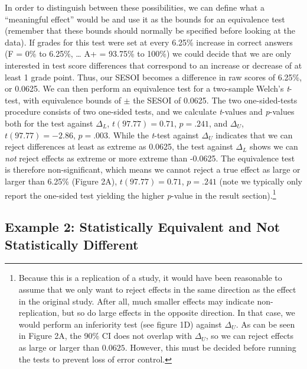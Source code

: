 \documentclass[english,floatsintext,man]{apa6}
\theoremstyle{definition}
\theoremstyle{definition}
\theoremstyle{definition}
\theoremstyle{remark}
\begin{document}
In order to distinguish between these possibilities, we can define what
a \enquote{meaningful effect} would be and use it as the bounds for an
equivalence test (remember that these bounds should normally be
specified before looking at the data). If grades for this test were set
at every 6.25\% increase in correct answers (F = 0\% to 6.25\%, \ldots{}
A+ = 93.75\% to 100\%) we could decide that we are only interested in
test score differences that correspond to an increase or decrease of at
least 1 grade point. Thus, our SESOI becomes a difference in raw scores
of 6.25\%, or 0.0625. We can then perform an equivalence test for a
two-sample Welch's \emph{t}-test, with equivalence bounds of \(\pm\) the
SESOI of 0.0625. The two one-sided-tests procedure consists of two
one-sided tests, and we calculate \emph{t}-values and \emph{p}-values
both for the test against \(\Delta_{L}\), \(t(97.77) = 0.71\),
\(p = .241\), and \(\Delta_{U}\), \(t(97.77) = -2.86\), \(p = .003\).
While the \emph{t}-test against \(\Delta_{U}\) indicates that we can
reject differences at least as extreme as 0.0625, the test against
\(\Delta_{L}\) shows we can \emph{not} reject effects as extreme or more
extreme than -0.0625. The equivalence test is therefore non-significant,
which means we cannot reject a true effect as large or larger than
6.25\% (Figure 2A), \(t(97.77) = 0.71\), \(p = .241\) (note we typically
only report the one-sided test yielding the higher \emph{p}-value in the
result section).\footnote{Because this is a replication of a study, it
  would have been reasonable to assume that we only want to reject
  effects in the same direction as the effect in the original study.
  After all, much smaller effects may indicate non-replication, but so
  do large effects in the opposite direction. In that case, we would
  perform an inferiority test (see figure 1D) against \(\Delta_{U}\). As
  can be seen in Figure 2A, the 90\% CI does not overlap with
  \(\Delta_{U}\), so we can reject effects as large or larger than
  \(0.0625\). However, this must be decided before running the tests to
  prevent loss of error control.}

\subsection{Example 2: Statistically Equivalent and Not Statistically
Different}\label{example-2-statistically-equivalent-and-not-statistically-different}
\end{document}
